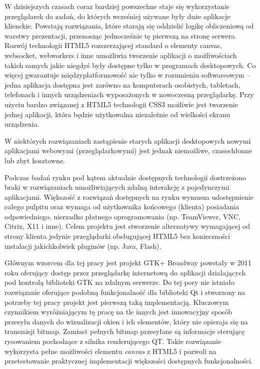 
W dzisiejszych czasach coraz bardziej powszechne staje się wykorzystanie przeglądarek do zadań, do których wcześniej używane były duże aplikacje klienckie. Powstają rozwiązania, które starają się oddzielić logikę obliczeniową od warstwy prezentacji, przenosząc jednocześnie tę pierwszą na stronę serwera. Rozwój technologii HTML5 rozszerzającej standard o elementy canvas, websocket, webworkers i inne umożliwia tworzenie aplikacji o możliwościach takich samych jakie niegdyś były dostępne tylko w programach desktopowych. Co więcej gwarantuje międzyplatformowość nie tylko w rozumieniu softwareowym -- jedna aplikacja dostępna jest zarówno na komputerach osobistych, tabletach, telefonach i innych urządzeniach wyposażonych w nowoczesną przeglądarkę. Przy użyciu bardzo związanej z HTML5 technologii CSS3 możliwie jest tworzenie jednej aplikacji, która będzie użytkowalna niezależnie od wielkości ekranu urządzenia.

W niektórych rozwiązaniach zastąpienie starych aplikacji desktopowych nowymi aplikacjami webowymi (przeglądarkowymi) jest jednak niemożliwe, czasochłonne lub zbyt kosztowne.

Podczas badań rynku pod kątem aktualnie dostępnych technologii dostrzeżono braki w rozwiązaniach umożliwiających zdalną interakcję z pojedynczymi aplikacjami. Większość z rozwiązań dostępnych na rynku wymusza udostępnienie całego pulpitu oraz wymaga od użytkownika końcowego (klienta) posiadania odpowiedniego, nierzadko płatnego oprogramowania (np. TeamViewer, VNC, Citrix, X11 i inne). Celem projektu jest stworzenie alternatywy wymagającej od strony klienta jedynie przeglądarki obsługującej HTML5 bez konieczności instalacji jakichkolwiek pluginów (np. Java, Flash).

Głównym wzorcem dla tej pracy jest projekt GTK+ Broadway powstały w 2011 roku oferujący dostęp przez przeglądarkę internetową do aplikacji działających pod kontrolą biblioteki GTK na zdalnym serwerze. Do tej pory nie istniało rozwiązanie oferujące podobną funkcjonalność dla biblioteki Qt i stworzony na potrzeby tej pracy projekt jest pierwszą taką implementacją. Kluczowym czynnikiem wyróżniającym tę pracę na tle innych jest innowacyjny sposób przesyłu danych do wizualizacji okien i ich elementów, który nie opieraja się na transmisji bitmap. Zamiast pełnych bitmap przesyłane są informacje sterującę rysowaniem pochodzące z silnika renderującego QT.
Takie rozwiązanie wykorzysta pełne możliwości elementu \emph{canvas} z HTML5 i pozwoli na przetestowanie praktycznej implementacji większości dostępnych funkcjonalności.

